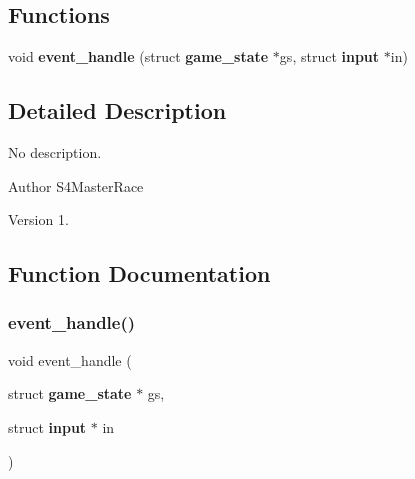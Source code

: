 \subsection*{Functions}
\begin{DoxyCompactItemize}
\item 
void \textbf{ event\+\_\+handle} (struct \textbf{ game\+\_\+state} $\ast$gs, struct \textbf{ input} $\ast$in)
\end{DoxyCompactItemize}


\subsection{Detailed Description}
No description. 

\begin{DoxyAuthor}{Author}
S4\+Master\+Race 
\end{DoxyAuthor}
\begin{DoxyVersion}{Version}
1. 
\end{DoxyVersion}


\subsection{Function Documentation}
\mbox{\label{event_8h_adaffdf4317dd1674648a10c44f428ea0}} 
\subsubsection{event\+\_\+handle()}
{\footnotesize\ttfamily void event\+\_\+handle (\begin{DoxyParamCaption}\item[{struct \textbf{ game\+\_\+state} $\ast$}]{gs,  }\item[{struct \textbf{ input} $\ast$}]{in }\end{DoxyParamCaption})}

